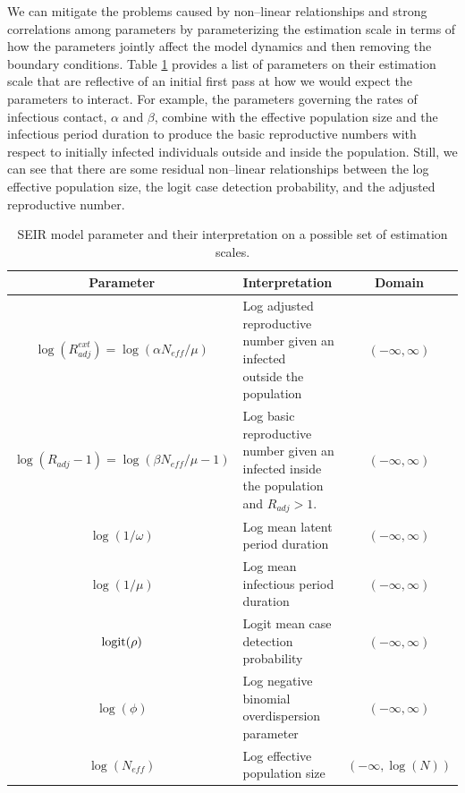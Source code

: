 We can mitigate the problems caused by non--linear relationships and strong correlations among parameters by parameterizing the estimation scale in terms of how the parameters jointly affect the model dynamics and then removing the boundary conditions. Table \ref{tab:seir_params_est2} provides a list of parameters on their estimation scale that are reflective of an initial first pass at how we would expect the parameters to interact. For example, the parameters governing the rates of infectious contact, $ \alpha$ and $\beta $, combine with the effective population size and the infectious period duration to produce the basic reproductive numbers with respect to initially infected individuals outside and inside the population. Still, we can see that there are some residual non--linear relationships between the log effective population size, the logit case detection probability, and the adjusted reproductive number.

\begin{table}[htbp]
	\caption{SEIR model parameter and their interpretation on a possible set of estimation scales.}
	\label{tab:seir_params_est2}
	\footnotesize
	\centering
	\begin{tabular}{clc}
		\hline
		\textbf{Parameter} & \textbf{Interpretation} & \textbf{Domain}\\
		\hline
		$\log(R_{adj}^{ext}) = \log(\alpha N_{eff} / \mu)$ & \makecell[l]{Log adjusted reproductive number given an infected \\outside the population} & $(-\infty,\infty) $ \\
		$ \log(R_{adj} - 1) = \log(\beta N_{eff}/\mu - 1) $ & \makecell[l]{Log basic reproductive number given an infected\\ inside the population and $ R_{adj} > 1 $.} & $(-\infty,\infty) $\\
		$ \log(1/\omega) $ & Log mean latent period duration & $(-\infty,\infty) $\\
		$ \log(1/\mu) $ & Log mean infectious period duration & $ (-\infty,\infty) $\\
		$ \mathrm{logit}(\rho) $ & Logit mean case detection probability & $(-\infty,\infty) $\\
		$ \log(\phi) $ & Log negative binomial overdispersion parameter & $ (-\infty,\infty) $ \\
		$ \log(N_{eff}) $ & Log effective population size & $(-\infty,\log(N))$\\
		\hline
	\end{tabular}
\end{table}

